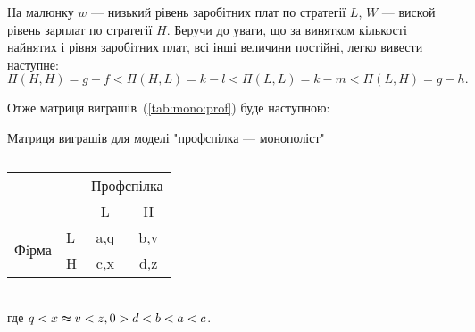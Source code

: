На малюнку $w$ --- низький рівень заробітних плат по стратегії $L$, $W$ --- виской рівень зарплат по стратегії $H$. 
Беручи до уваги, що за винятком кількості найнятих і рівня заробітних плат, всі інші величини постійні,
легко вивести наступне:
\begin{equation}
\Pi(H,H)=g-f < \Pi(H,L)=k-l < \Pi(L, L)=k-m < \Pi(L,H)=g-h.
\end{equation}

Отже матриця виграшів~(\ref{tab:mono:prof}) буде наступною:
\begin{table}[h]
	
	\centering
	\caption{}
	Матриця виграшів для моделі "профспілка --- монополіст"\\
		\normalsize

\begin{tabular}{|l|l|c|c|}
	\hline
	\multicolumn{2}{|l|}{\multirow{2}{*}{}} & \multicolumn{2}{l|}{Профспілка} \\ \cline{3-4} 
	\multicolumn{2}{|l|}{}                  & L                & H                \\ \hline
	\multirow{2}{*}{Фiрма}    & L   & a,q              & b,v              \\ \cline{2-4} 
	& H   & c,x              & d,z              \\ \hline
\end{tabular}
	\label{table:firm}
\end{table}\\
где $q < x \thickapprox v < z, 0 > d < b < a < c$.
